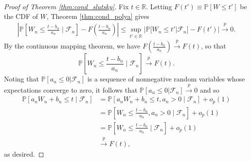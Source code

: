 \documentclass[aos]{imsart}
\theoremstyle{plain}
\theoremstyle{remark}
\renewcommand{\P}{\mathbb{P}}							%
\newcommand{\R}{\mathbb{R}}								%
\newcommand{\convp}{\overset p \rightarrow}             %
\begin{document}
	\begin{proof}[Proof of Theorem \ref{thm:cond_slutsky}]
		Fix $t \in \R$. Letting $F(t') \equiv \P[W \leq t']$ be the CDF of $W$, Theorem \ref{thm:cond_polya} gives 
		\begin{align*}
			\left|\P\left[W_n\leq \frac{t - b_n}{a_n}\mid\mathcal{F}_n\right]-F\left(\frac{t - b_n}{a_n}\right)\right| \leq	\sup_{t' \in \R}|\P[W_n\leq t'|\mathcal{F}_n]-F(t')|\convp0.
		\end{align*}
		By the continuous mapping theorem, we have $F\left(\frac{t - b_n}{a_n}\right) \convp F(t)$, so that
		\begin{equation*}
			\P\left[W_n\leq \frac{t - b_n}{a_n}\mid\mathcal{F}_n\right] \convp F(t).
		\end{equation*}
		Noting that $\P[a_n \leq 0 | \mathcal F_n]$ is a sequence of nonnegative random variables whose expectations converge to zero, it follows that $\P[a_n \leq 0 | \mathcal F_n] \convp 0$ and so
		\begin{equation*}
			\begin{split}
				\P\left[a_nW_n + b_n \leq t \mid\mathcal{F}_n\right] &= \P\left[a_nW_n + b_n \leq t, a_n > 0\mid\mathcal{F}_n\right] + o_p(1) \\
				&= \P\left[W_n\leq \frac{t - b_n}{a_n}, a_n > 0\mid\mathcal{F}_n\right] + o_p(1) \\
				&= \P\left[W_n\leq \frac{t - b_n}{a_n}\mid\mathcal{F}_n\right] + o_p(1) \\
				&\convp F(t),
			\end{split}
		\end{equation*}
		as desired.
	\end{proof}
	
\end{document}
